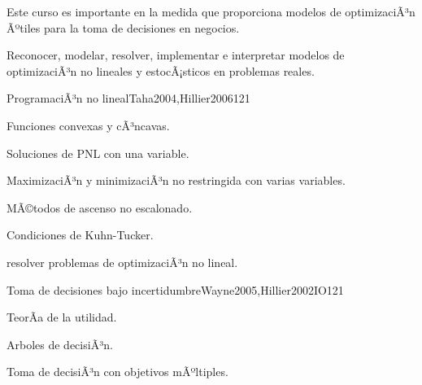 \begin{syllabus}


\begin{justification}
Este curso es importante en la medida que proporciona modelos de optimizaciÃ³n Ãºtiles para la toma de decisiones en negocios.
\end{justification}

\begin{goals}
\item Reconocer, modelar, resolver, implementar e interpretar modelos de optimizaciÃ³n no lineales y estocÃ¡sticos en problemas reales.
\end{goals}

\begin{outcomes}
\end{outcomes}

\begin{unit}{ProgramaciÃ³n no lineal}{Taha2004,Hillier2006}{12}{1}
   \begin{topics}
      \item Funciones convexas y cÃ³ncavas.
      \item Soluciones de PNL con una variable.
      \item MaximizaciÃ³n y minimizaciÃ³n no restringida con varias variables.
      \item MÃ©todos de ascenso no escalonado.
      \item Condiciones de Kuhn-Tucker.
   \end{topics}

   \begin{unitgoals}
      \item resolver problemas de optimizaciÃ³n no lineal.
   \end{unitgoals}
\end{unit}

\begin{unit}{Toma de decisiones bajo incertidumbre}{Wayne2005,Hillier2002IO}{12}{1}
   \begin{topics}
      \item TeorÃ­a de la utilidad.
      \item Arboles de decisiÃ³n.
      \item Toma de decisiÃ³n con objetivos mÃºltiples.
   \end{topics}


\end{unit}
\end{syllabus}
